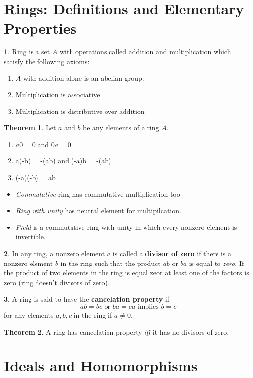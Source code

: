 \documentclass[a4paper,12pt]{article}
\theoremstyle{definition}
\newtheorem{definition}{}[section]
\theoremstyle{axiom}
\theoremstyle{theorem}
\newtheorem{theorem}{Theorem}[section]
\theoremstyle{lemma}
\begin{document}
\section{Rings: Definitions and Elementary Properties}
\begin{definition}{}
    Ring is a set $A$ with operations called addition and multiplication which satisfy the following axioms:
        \begin{enumerate}
            \item $A$ with addition alone is an abelian group.
            \item Multiplication is associative
            \item Multiplication is distributive over addition
        \end{enumerate}
\end{definition}
\begin{theorem}{}
    Let $a$ and $b$ be any elements of a ring $A$.
        \renewcommand{\labelenumiii}{\theenumi}
        \begin{enumerate}
            \item $a0 = 0$ and $0a = 0$
            \item a(-b) = -(ab) and (-a)b = -(ab)
            \item (-a)(-b) = ab
        \end{enumerate}
\end{theorem}
\begin{itemize}
    \item \textit{Commutative} ring has commutative multiplication too.
    \item \textit{Ring with unity} has neutral element for multipilcation.
    \item \textit{Field} is a commutative ring with unity in which every nonzero element is invertible.
\end{itemize}
\begin{definition}{}
        In any ring, a nonzero element $a$ is called a \textbf{divisor of zero} if there is a nonzero element $b$ in the ring such that the product $ab$ or $ba$ is equal to \textit{zero}. If the product of two elements in the ring is equal zeor at least one of the factors is zero (ring doesn't divisors of zero).
\end{definition}
\begin{definition}{}
    A ring is said to have the \textbf{cancelation property} if
        \begin{equation*}
            ab = bc \text{ or } ba = ca \text{ implies } b = c
        \end{equation*}
    for any elements $a, b, c$ in the ring if $a \neq 0$.
\end{definition}
\begin{theorem}{}
    A ring has cancelation property \textit{iff} it has no divisors of zero.
\end{theorem}
\section{Ideals and Homomorphisms}
\end{document}
